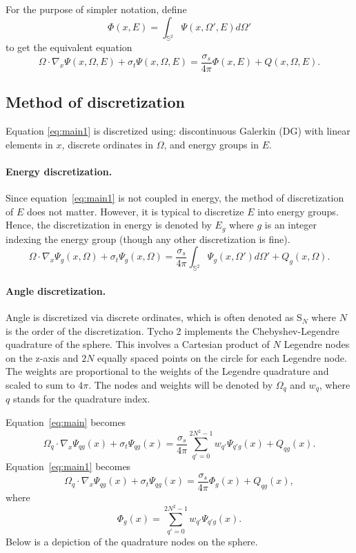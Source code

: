 \documentclass[12pt,letterpaper]{article}
\begin{document}
For the purpose of simpler notation, define
\begin{equation}
\Phi(x,E) = \int_{\mathbb{S}^2} \Psi(x,\Omega',E) d\Omega'
\end{equation}
to get the equivalent equation
\begin{equation} \label{eq:main1}
\Omega \cdot \nabla_x \Psi(x,\Omega,E) + \sigma_t \Psi(x,\Omega,E) = \frac{\sigma_s}{4\pi} \Phi(x,E) + Q(x,\Omega,E).
\end{equation}


\subsection{Method of discretization}
Equation \eqref{eq:main1} is discretized using: discontinuous Galerkin (DG) with linear elements in $x$, discrete ordinates in $\Omega$, and energy groups in $E$.


\paragraph{Energy discretization.}
Since equation~\eqref{eq:main1} is not coupled in energy, the method of discretization of $E$ does not matter.
However, it is typical to discretize $E$ into energy groups.
Hence, the discretization in energy is denoted by $E_g$ where $g$ is an integer indexing the energy group (though any other discretization is fine).
\begin{equation}
\Omega \cdot \nabla_x \Psi_g(x,\Omega) + \sigma_t \Psi_g(x,\Omega) = \frac{\sigma_s}{4\pi} \int_{\mathbb{S}^2} \Psi_g(x,\Omega') d\Omega' + Q_g(x,\Omega).
\end{equation}


\paragraph{Angle discretization.}
Angle is discretized via discrete ordinates, which is often denoted as S$_N$ where $N$ is the order of the discretization.
Tycho 2 implements the Chebyshev-Legendre quadrature of the sphere.
This involves a Cartesian product of $N$ Legendre nodes on the z-axis and $2N$ equally spaced points on the circle for each Legendre node.
The weights are proportional to the weights of the Legendre quadrature and scaled to sum to $4\pi$.
The nodes and weights will be denoted by $\Omega_q$ and $w_q$, where $q$ stands for the quadrature index.

Equation~\eqref{eq:main} becomes
\begin{equation}
\Omega_q \cdot \nabla_x \Psi_{qg}(x) + \sigma_t \Psi_{qg}(x) = 
\frac{\sigma_s}{4\pi} \sum_{q'=0}^{2N^2-1} w_{q'} \Psi_{q'g}(x) + Q_{qg}(x).
\end{equation}
Equation~\eqref{eq:main1} becomes
\begin{equation}
\Omega_q \cdot \nabla_x \Psi_{qg}(x) + \sigma_t \Psi_{qg}(x) = 
\frac{\sigma_s}{4\pi} \Phi_{g}(x) + Q_{qg}(x),
\end{equation}
where
\begin{equation}
\Phi_g(x) = \sum_{q'=0}^{2N^2-1} w_{q'} \Psi_{q'g}(x).
\end{equation}
Below is a depiction of the quadrature nodes on the sphere.
\end{document}
